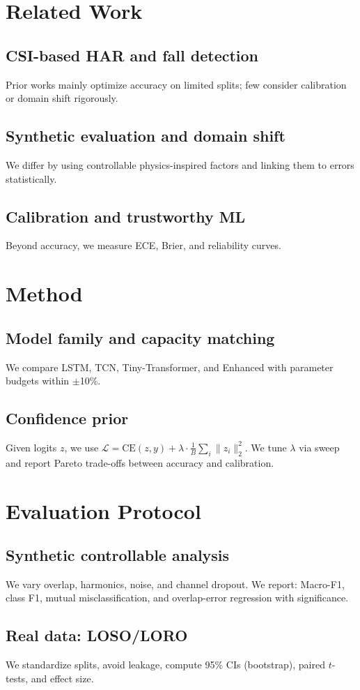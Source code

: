 \documentclass[10pt,conference]{IEEEtran}
\newcommand{\model}{Enhanced}
\begin{document}
\section{Related Work}
\subsection{CSI-based HAR and fall detection}
Prior works mainly optimize accuracy on limited splits; few consider calibration or domain shift rigorously.
\subsection{Synthetic evaluation and domain shift}
We differ by using controllable physics-inspired factors and linking them to errors statistically.
\subsection{Calibration and trustworthy ML}
Beyond accuracy, we measure ECE, Brier, and reliability curves.

\section{Method}
\subsection{Model family and capacity matching}
We compare LSTM, TCN, Tiny-Transformer, and \model{} with parameter budgets within $\pm$10\%.
\subsection{Confidence prior}
Given logits $z$, we use $\mathcal{L}=\mathrm{CE}(z,y)+\lambda \cdot \frac{1}{B}\sum_i \|z_i\|_2^2$. We tune $\lambda$ via sweep and report Pareto trade-offs between accuracy and calibration.

\section{Evaluation Protocol}
\subsection{Synthetic controllable analysis}
We vary overlap, harmonics, noise, and channel dropout. We report: Macro-F1, class F1, mutual misclassification, and overlap-error regression with significance.
\subsection{Real data: LOSO/LORO}
We standardize splits, avoid leakage, compute 95\% CIs (bootstrap), paired $t$-tests, and effect size.
\end{document}
